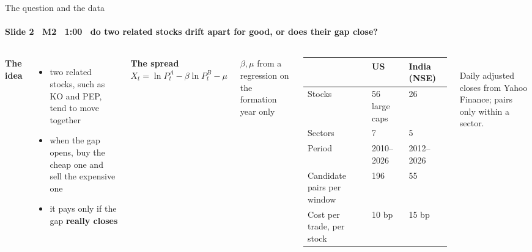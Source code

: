 \begin{frame}{The question and the data}
\framesubtitle{Slide 2 \textbullet\ M2 \textbullet\ 1:00 \textbullet\ do two related stocks drift apart for good, or does their gap close?}
\vspace{-2pt}
\begin{columns}[T,onlytextwidth]
  \footnotesize\raggedright
  \textbf{\color{deckAccent}The idea}
  \begin{itemize}\setlength{\itemsep}{1pt}
    \item two related stocks, such as KO and PEP, tend to move together
    \item when the gap opens, buy the cheap one and sell the expensive one
    \item it pays only if the gap \textbf{really closes}
  \end{itemize}
  \vspace{3pt}
  \textbf{\color{deckAccent}The spread}\\[2pt]
  \centering $X_t=\ln P^A_t-\beta\ln P^B_t-\mu$\\[2pt]
  \raggedright\scriptsize $\beta,\mu$ from a regression on the formation year only
  \scriptsize\setlength{\tabcolsep}{4pt}
  \begin{tabular}{@{}lll@{}}
    \toprule
    & US & India (NSE) \\
    \midrule
    Stocks         & 56 large caps  & 26 \\
    Sectors        & 7              & 5 \\
    Period         & 2010--2026     & 2012--2026 \\
    Candidate pairs per window & 196 & 55 \\
    Cost per trade, per stock  & 10 bp & 15 bp \\
    \bottomrule
  \end{tabular}\\[4pt]
  \footnotesize
  Daily adjusted closes from Yahoo Finance; pairs only within a sector.
\end{columns}
\end{frame}
